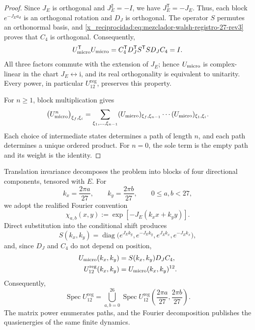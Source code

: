 \begin{proof}
Since \(J_E\) is orthogonal and \(J_E^2=-I\), we have
\(J_E^{\mathsf T}=-J_E\). Thus, each block
\(e^{-J_Ea_d}\) is an orthogonal rotation and \(D_J\) is orthogonal.
The operator \(S\) permutes an orthonormal basis, and
\eqref{x_reciprocidad:eq:mezclador-walsh-registro-27-rev3} proves that \(C_4\) is
orthogonal. Consequently,
\[
 U_{\rm micro}^{\mathsf T}U_{\rm micro}
 =C_4^{\mathsf T}D_J^{\mathsf T}S^{\mathsf T}
   S D_JC_4
 =I.
\]
All three factors commute with the extension of \(J_E\); hence
\(U_{\rm micro}\) is complex-linear in the chart \(J_E\leftrightarrow\mathrm i\), and its real
orthogonality is equivalent to unitarity. Every power, in particular
\(U_{12}^{\mathrm{reg}}\), preserves this property.

For \(n\geq1\), block multiplication gives
\[
 \bigl(U_{\rm micro}^{n}\bigr)_{\xi_f,\xi_i}
 =
 \sum_{\xi_1,\ldots,\xi_{n-1}}
 (U_{\rm micro})_{\xi_f,\xi_{n-1}}
 \cdots
 (U_{\rm micro})_{\xi_1,\xi_i}.
\]
Each choice of intermediate states determines a path of length \(n\),
and each path determines a unique ordered product. For \(n=0\), the sole
term is the empty path and its weight is the identity.
\end{proof}

Translation invariance decomposes the problem into blocks of four
directional components, tensored with \(E\). For
\[
 k_x=\frac{2\pi a}{27},
 \qquad
 k_y=\frac{2\pi b}{27},
 \qquad 0\leq a,b<27,
\]
we adopt the realified Fourier convention
\[
 \chi_{a,b}(x,y)
 :=\exp[-J_E(k_xx+k_yy)].
\]
Direct substitution into the conditional shift produces
\[
 S(k_x,k_y)
 =\operatorname{diag}
 \bigl(
  e^{J_Ek_y},e^{-J_Ek_y},
  e^{J_Ek_x},e^{-J_Ek_x}
 \bigr),
\]
and, since \(D_J\) and \(C_4\) do not depend on position,
\begin{equation}
 \begin{aligned}
 U_{\rm micro}(k_x,k_y)
   &=S(k_x,k_y)D_JC_4,\\
 U_{12}^{\mathrm{reg}}(k_x,k_y)
   &=U_{\rm micro}(k_x,k_y)^{12}.
 \end{aligned}
 \label{x_reciprocidad:eq:bloques-fourier-registro-27-rev3}
\end{equation}
Consequently,
\[
 \operatorname{Spec}U_{12}^{\mathrm{reg}}
 =
 \bigcup_{a,b=0}^{26}
 \operatorname{Spec}
 U_{12}^{\mathrm{reg}}
 \left(\frac{2\pi a}{27},\frac{2\pi b}{27}\right).
\]
The matrix power enumerates paths, and the Fourier decomposition publishes
the quasienergies of the same finite dynamics.

